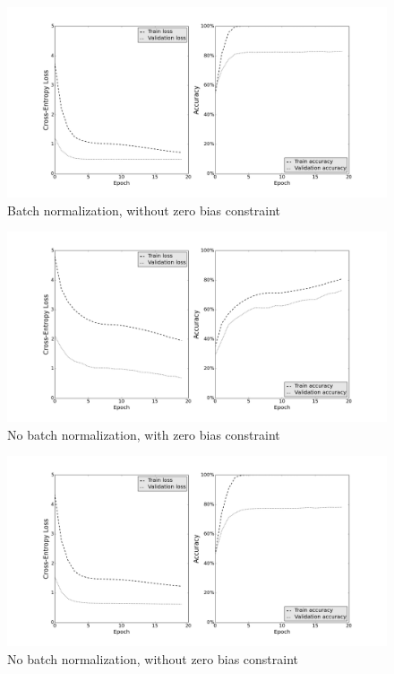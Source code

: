 \documentclass[a4paper, 11pt]{article}
\begin{document}
\begin{figure}[H]
	\includegraphics[width=\linewidth]{bn_no-bias-constraint.png}
	\caption{Batch normalization, without zero bias constraint}
	\label{fig:bn_no-bias}
\end{figure}

\begin{figure}[H]
	\includegraphics[width=\linewidth]{no-bn_bias-constraint.png}
	\caption{No batch normalization, with zero bias constraint}
	\label{fig:no-bn_bias}
\end{figure}

\begin{figure}[H]
	\includegraphics[width=\linewidth]{no-bn_no-bias-constraint.png}
	\caption{No batch normalization, without zero bias constraint}
	\label{fig:no-bn_no-bias}
\end{figure}
\end{document}
